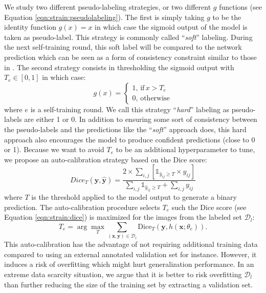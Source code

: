We study two different pseudo-labeling strategies, or two different $g$ functions (see Equation \ref{eqn:strain:pseudolabeling}). The first is simply taking $g$ to be the identity function $g(x) = x$ in which case the sigmoid output of the model is taken as pseudo-label. This strategy is commonly called  ``\textit{soft}'' labeling. During the next self-training round, this soft label will be compared to the network prediction which can be seen as a form of consistency constraint similar to those in \cite{laine2016temporal,tarvainen2017mean, sohn2020fixmatch}. The second strategy consists in thresholding the sigmoid output with $T_e \in [0, 1]$ in which case:
\begin{equation}
g(x) = \begin{cases}
1,\,\text{if}\, x > T_e\\
0,\,\text{otherwise}
\end{cases}
\end{equation}   
where $e$ is a self-training round. We call this strategy ``\textit{hard}'' labeling as pseudo-labels are either 1 or 0. In addition to ensuring some sort of consistency between the pseudo-labels and the predictions like the ``\textit{soft}'' approach does, this hard approach also encourages the model to produce confident predictions (close to 0 or 1). Because we want to avoid $T_e$ to be an additional hyperparameter to tune, we propose an auto-calibration strategy based on the Dice score: 
\begin{equation}
  Dice_T(\mathbf{y},\hat{\mathbf{y}}) = \dfrac{2 \times \sum_{i,j} \left[\mathbb{1}_{\hat{y}_{ij} \geq T} \times y_{ij}\right]}{\sum_{i,j} \mathbb{1}_{\hat{y}_{ij} \geq T} + \sum_{i,j} y_{ij}}
  \label{eqn:strain:dice}
\end{equation}
where $T$ is the threshold applied to the model output to generate a binary prediction. The auto-calibration procedure selects $T_e$ such the Dice score (see Equation \ref{eqn:strain:dice}) is maximized for the images from the labeled set $\mathcal{D}_{l}$:
\begin{equation}
T_e = \arg \underset{T}{\max} \sum_{(\mathbf{x}, \mathbf{y}) \in \mathcal{D}_l} \text{Dice}_T\left(\mathbf{y},h( \mathbf{x}; \theta_{e})\right).
\label{eqn:strain:thresholdopt}
\end{equation}
This auto-calibration has the advantage of not requiring additional training data compared to using an external annotated validation set for instance. However, it induces a risk of overfitting which might hurt generalization performance. In an extreme data scarcity situation, we argue that it is better to risk overfitting $\mathcal{D}_l$ than further reducing the size of the training set by extracting a validation set. 

